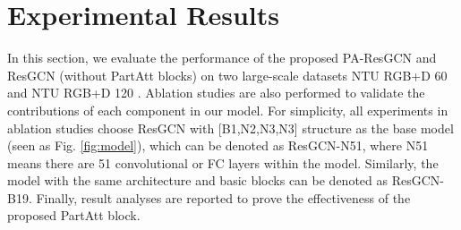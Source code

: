 \documentclass[sigconf]{acmart}
\begin{document}
\section{Experimental Results}
\label{sec:experiments}

In this section, we evaluate the performance of the proposed PA-ResGCN and ResGCN (without PartAtt blocks) on two large-scale datasets NTU RGB+D 60 \cite{shahroudy2016ntu} and NTU RGB+D 120 \cite{liu2019ntu}. Ablation studies are also performed to validate the contributions of each component in our model. For simplicity, all experiments in ablation studies choose ResGCN with [B1,N2,N3,N3] structure as the base model (seen as Fig. \ref{fig:model}), which can be denoted as ResGCN-N51, where N51 means there are 51 convolutional or FC layers within the model. Similarly, the model with the same architecture and basic blocks can be denoted as ResGCN-B19. Finally, result analyses are reported to prove the effectiveness of the proposed PartAtt block.
\end{document}
